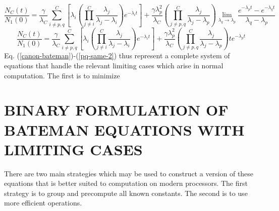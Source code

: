 \documentclass[letterpaper]{physor2018}
\begin{document}
\begin{equation}
\label{pq-same-1}
   \frac{N_C(t)}{N_1(0)} = \frac{\gamma}{\lambda_C}\sum_{i\ne p,q}^{C} \left[\lambda_i \left(\prod_{j\ne i}^{C} \frac{\lambda_j}{\lambda_j - \lambda_i}\right) e^{-\lambda_i t}\right]
                           + \frac{\gamma\lambda_p^2}{\lambda_C} \left(\prod_{j\ne p,q}^{C} \frac{\lambda_j}{\lambda_j - \lambda_p} \right)
                             \lim_{\lambda_q\to\lambda_p}\frac{e^{-\lambda_p t} - e^{-\lambda_q t}}{\lambda_q - \lambda_p}
\end{equation}
\begin{equation}
\label{pq-same-2}
   \frac{N_C(t)}{N_1(0)} = \frac{\gamma}{\lambda_C}\sum_{i\ne p,q}^{C} \left[\lambda_i \left(\prod_{j\ne i}^{C} \frac{\lambda_j}{\lambda_j - \lambda_i}\right) e^{-\lambda_i t}\right]
                           + \frac{\gamma\lambda_p^2}{\lambda_C} \left(\prod_{j\ne p,q}^{C} \frac{\lambda_j}{\lambda_j - \lambda_p} \right) t e^{-\lambda_p t}
\end{equation}
Eq. (\ref{canon-bateman})-(\ref{pq-same-2}) thus represent a complete system of equations that
handle the relevant limiting cases which arise in normal computation. The first is to minimize

\section{BINARY FORMULATION OF BATEMAN EQUATIONS WITH LIMITING CASES}
\label{sec-binary}
There are two main strategies which may be used to construct a version of these equations that
is better suited to computation on modern processors. The first strategy is to group and
precompute all known constants. The second is to use more efficient operations.
\end{document}
